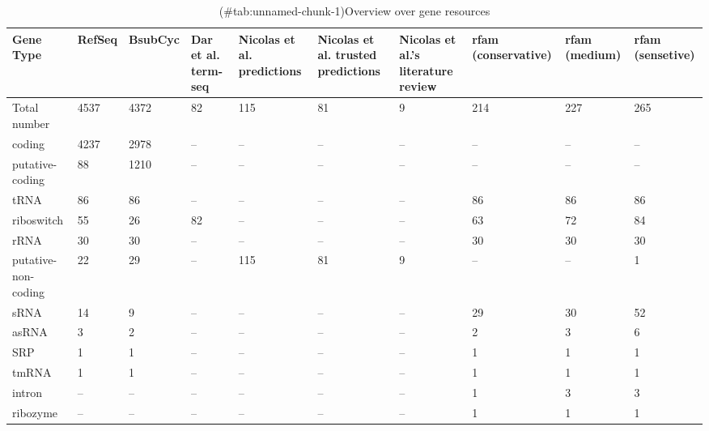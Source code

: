 \begin{table}[t]

\caption{(\#tab:unnamed-chunk-1)Overview over gene resources}
\centering
\begin{tabular}{llllllllll}
\toprule
Gene Type & RefSeq & BsubCyc & Dar et al. term-seq & Nicolas et al. predictions & Nicolas et al. trusted predictions & Nicolas et al.'s literature review & rfam (conservative) & rfam (medium) & rfam (sensetive)\\
\midrule
Total number & 4537 & 4372 & 82 & 115 & 81 & 9 & 214 & 227 & 265\\
coding & 4237 & 2978 & -- & -- & -- & -- & -- & -- & --\\
putative-coding & 88 & 1210 & -- & -- & -- & -- & -- & -- & --\\
tRNA & 86 & 86 & -- & -- & -- & -- & 86 & 86 & 86\\
riboswitch & 55 & 26 & 82 & -- & -- & -- & 63 & 72 & 84\\
\addlinespace
rRNA & 30 & 30 & -- & -- & -- & -- & 30 & 30 & 30\\
putative-non-coding & 22 & 29 & -- & 115 & 81 & 9 & -- & -- & 1\\
sRNA & 14 & 9 & -- & -- & -- & -- & 29 & 30 & 52\\
asRNA & 3 & 2 & -- & -- & -- & -- & 2 & 3 & 6\\
SRP & 1 & 1 & -- & -- & -- & -- & 1 & 1 & 1\\
\addlinespace
tmRNA & 1 & 1 & -- & -- & -- & -- & 1 & 1 & 1\\
intron & -- & -- & -- & -- & -- & -- & 1 & 3 & 3\\
ribozyme & -- & -- & -- & -- & -- & -- & 1 & 1 & 1\\
\bottomrule
\end{tabular}
\end{table}

